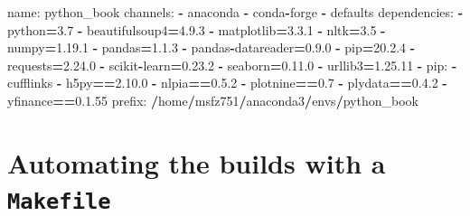 \documentclass[
]{book}
\newenvironment{Shaded}{\begin{snugshade}}{\end{snugshade}}
\newcommand{\DecValTok}[1]{\textcolor[rgb]{0.06,0.06,0.06}{#1}}
\newcommand{\FloatTok}[1]{\textcolor[rgb]{0.06,0.06,0.06}{#1}}
\newcommand{\NormalTok}[1]{#1}
\newcommand{\OperatorTok}[1]{\textcolor[rgb]{0.43,0.43,0.43}{\textbf{#1}}}
\begin{document}
\begin{Shaded}
\begin{Highlighting}[]
\NormalTok{name: python_book}
\NormalTok{channels:}
  \OperatorTok{-}\NormalTok{ anaconda}
  \OperatorTok{-}\NormalTok{ conda}\OperatorTok{-}\NormalTok{forge}
  \OperatorTok{-}\NormalTok{ defaults}
\NormalTok{dependencies:}
  \OperatorTok{-}\NormalTok{ python}\OperatorTok{=}\FloatTok{3.7}
  \OperatorTok{-}\NormalTok{ beautifulsoup4}\OperatorTok{=}\DecValTok{4}\NormalTok{.}\FloatTok{9.3}
  \OperatorTok{-}\NormalTok{ matplotlib}\OperatorTok{=}\DecValTok{3}\NormalTok{.}\FloatTok{3.1}
  \OperatorTok{-}\NormalTok{ nltk}\OperatorTok{=}\FloatTok{3.5}
  \OperatorTok{-}\NormalTok{ numpy}\OperatorTok{=}\DecValTok{1}\NormalTok{.}\FloatTok{19.1}
  \OperatorTok{-}\NormalTok{ pandas}\OperatorTok{=}\DecValTok{1}\NormalTok{.}\FloatTok{1.3}
  \OperatorTok{-}\NormalTok{ pandas}\OperatorTok{-}\NormalTok{datareader}\OperatorTok{=}\DecValTok{0}\NormalTok{.}\FloatTok{9.0}
  \OperatorTok{-}\NormalTok{ pip}\OperatorTok{=}\DecValTok{20}\NormalTok{.}\FloatTok{2.4}
  \OperatorTok{-}\NormalTok{ requests}\OperatorTok{=}\DecValTok{2}\NormalTok{.}\FloatTok{24.0}
  \OperatorTok{-}\NormalTok{ scikit}\OperatorTok{-}\NormalTok{learn}\OperatorTok{=}\DecValTok{0}\NormalTok{.}\FloatTok{23.2}
  \OperatorTok{-}\NormalTok{ seaborn}\OperatorTok{=}\DecValTok{0}\NormalTok{.}\FloatTok{11.0}
  \OperatorTok{-}\NormalTok{ urllib3}\OperatorTok{=}\DecValTok{1}\NormalTok{.}\FloatTok{25.11}
  \OperatorTok{-}\NormalTok{ pip:}
    \OperatorTok{-}\NormalTok{ cufflinks}
    \OperatorTok{-}\NormalTok{ h5py}\OperatorTok{==}\DecValTok{2}\NormalTok{.}\FloatTok{10.0}
    \OperatorTok{-}\NormalTok{ nlpia}\OperatorTok{==}\DecValTok{0}\NormalTok{.}\FloatTok{5.2}
    \OperatorTok{-}\NormalTok{ plotnine}\OperatorTok{==}\FloatTok{0.7}
    \OperatorTok{-}\NormalTok{ plydata}\OperatorTok{==}\DecValTok{0}\NormalTok{.}\FloatTok{4.2}
    \OperatorTok{-}\NormalTok{ yfinance}\OperatorTok{==}\DecValTok{0}\NormalTok{.}\FloatTok{1.55}
\NormalTok{prefix: }\OperatorTok{/}\NormalTok{home}\OperatorTok{/}\NormalTok{msfz751}\OperatorTok{/}\NormalTok{anaconda3}\OperatorTok{/}\NormalTok{envs}\OperatorTok{/}\NormalTok{python_book}
\end{Highlighting}
\end{Shaded}

\hypertarget{automating-the-builds-with-a-makefile}{%
\section*{\texorpdfstring{Automating the builds with a \texttt{Makefile}}{Automating the builds with a Makefile}}\label{automating-the-builds-with-a-makefile}}
\end{document}
